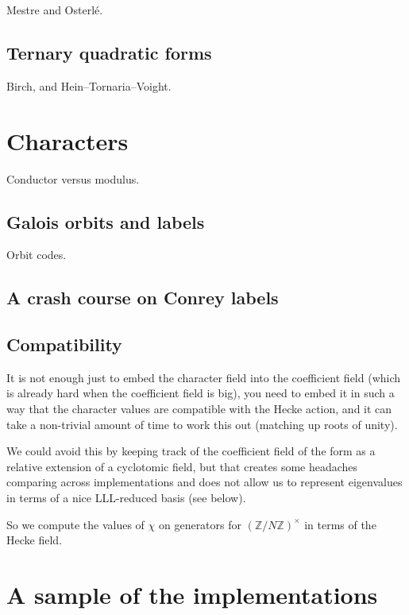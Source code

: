 \documentclass[11pt]{amsart}
\numberwithin{equation}{subsection}
\theoremstyle{plain}
\theoremstyle{definition}
\newcommand{\Z}{\mathbb{Z}}
\begin{document}
Mestre and Osterl\'e.  

\subsection{Ternary quadratic forms}

Birch, and Hein--Tornaria--Voight.



\section{Characters} \label{sec:chars}

Conductor versus modulus.

\subsection{Galois orbits and labels}

Orbit codes.

\subsection{A crash course on Conrey labels}

\subsection{Compatibility}

It is not enough just to embed the character field into the coefficient field (which is already hard when the coefficient field is big), you need to embed it in such a way that the character values are compatible with the Hecke action, and it can take a non-trivial amount of time to work this out (matching up roots of unity).

We could avoid this by keeping track of the coefficient field of the form as a relative extension of a cyclotomic field, but that creates some headaches comparing across implementations and does not allow us to represent eigenvalues in terms of a nice LLL-reduced basis (see below).  

So we compute the values of $\chi$ on generators for $(\Z/N\Z)^\times$ in terms of the Hecke field.

\section{A sample of the implementations} \label{sec:implementations}
\end{document}
